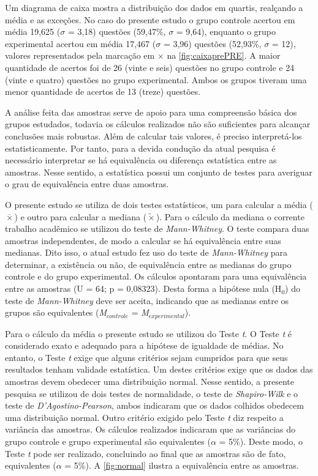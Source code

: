 Um diagrama de caixa mostra a distribuição dos dados em quartis, realçando a média e as exceções. No caso do presente estudo o grupo controle acertou em média 19,625 ($\sigma$ = 3,18) questões (59,47\%, $\sigma$ = 9,64), enquanto o grupo experimental acertou em média 17,467 ($\sigma$ = 3,96) questões (52,93\%, $\sigma$ = 12), valores representados pela marcação em $\times$ na \autoref{fig:caixaprePRE}. A maior quantidade de acertos foi de 26 (vinte e seis) questões no grupo controle e 24 (vinte e quatro) questões no grupo experimental. Ambos os grupos tiveram uma menor quantidade de acertos de 13 (treze) questões.

A análise feita das amostras serve de apoio para uma compreensão básica dos grupos estudados, todavia os cálculos realizados não são suficientes para alcançar conclusões mais robustas. Além de calcular tais valores, é preciso interpretá-los estatisticamente. Por tanto, para a devida condução da atual pesquisa é necessário interpretar se há equivalência ou diferença estatística entre as amostras. Nesse sentido, a estatística possui um conjunto de testes para averiguar o grau de equivalência entre duas amostras. %

O presente estudo se utiliza de dois testes estatísticos, um para calcular a média ($\overline{\times}$) e outro para calcular a mediana ($\tilde{\times}$). Para o cálculo da mediana o corrente trabalho acadêmico se utilizou do teste de \textit{Mann-Whitney}. O teste compara duas amostras independentes, de modo a calcular se há equivalência entre suas medianas. Dito isso, o atual estudo fez uso do teste de \textit{Mann-Whitney} para determinar, a existência ou não, de equivalência entre as medianas do grupo controle e do grupo experimental. Os cálculos apontaram para uma equivalência entre as amostras (U = 64; p = 0,08323). Desta forma a hipótese nula (H$_0$) do teste de \textit{Mann-Whitney} deve ser aceita, indicando que as medianas entre os grupos são equivalentes (\textit{M}$_{controle}$ = \textit{M}$_{experimental}$). %

Para o cálculo da média o presente estudo se utilizou do Teste \textit{t}. O Teste \textit{t} é considerado exato e adequado para a hipótese de igualdade de médias. No entanto, o Teste \textit{t} exige que alguns critérios sejam cumpridos para que seus resultados tenham validade estatística. Um destes critérios exige que os dados das amostras devem obedecer uma distribuição normal. Nesse sentido, a presente pesquisa se utilizou de dois testes de normalidade, o teste de \textit{Shapiro-Wilk} e o teste de \textit{D'Agostino-Pearson}, ambos indicaram que  os dados colhidos obedecem uma distribuição normal. Outro critério exigido pelo Teste \textit{t} diz respeito a variância das amostras. Os cálculos realizados indicaram que as variâncias do grupo controle e grupo experimental são equivalentes ($\alpha$ = 5\%). Deste modo, o Teste \textit{t} pode ser realizado, concluindo ao final que as amostras são de fato, equivalentes ($\alpha$ = 5\%). A \autoref{fig:normal} ilustra a equivalência entre as amostras. 


